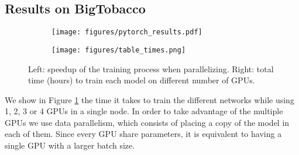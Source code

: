 \documentclass[runningheads]{llncs}
\begin{document}
\subsection{Results on BigTobacco}

\begin{figure}[H]
\centering
\begin{subfigure}{.6\textwidth}
  \centering
  \texttt{[image: figures/pytorch\_results.pdf]}
\end{subfigure}\begin{subfigure}{.4\textwidth}
  \centering
  \texttt{[image: figures/table\_times.png]}
\end{subfigure}
\caption{Left: speedup of the training process when parallelizing. Right: total time (hours) to train each model on different number of GPUs.}
\label{fig:times}
\end{figure}

We show in Figure \ref{fig:times} the time it takes to train the different networks while using 1, 2, 3 or 4 GPUs in a single node. In order to take advantage of the multiple GPUs we use data parallelism, which consists of placing a copy of the model in each of them. Since every GPU share parameters, it is equivalent to having a single GPU with a larger batch size.

\begin{comment}
\begin{table}
\caption{Time (hours) needed to train the EfficientNet models.}
\centering
\begin{tabular}{|c|c|c|c|c|}
\hline
\backslashbox{Model}{GPUs}
 & 1    & 2    & 3    & 4    \\ \hline
B0    & 13.33 & 6.81  & 4.58  & 3.4  \\ \hline
B1    & 19.44 & 9.81 & 6.81  & 4.94  \\ \hline
B2    & 20.55 & 10.22 & 6.92  & 5.16  \\ \hline
B3    & 25.64 & 12.94 & 8.78 & 6.55 \\ \hline
B4    & 34.28 & 17.36 & 11.69 & 8.75 \\ \hline
\end{tabular}
\label{hours}
\end{table}
\end{comment}
\end{document}
